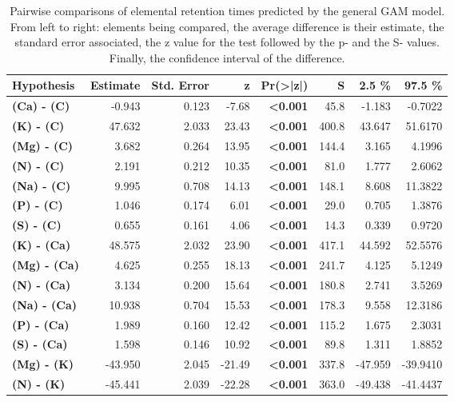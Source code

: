 \begin{table}[H]
\centering
\caption{\label{tab:table_pairs_i_rt}Pairwise comparisons of elemental retention times predicted by the general GAM model. From left to right: elements being compared, the average difference is their estimate, the standard error associated, the z value for the test followed by the p- and the S- values. Finally, the confidence interval of the difference.}
\centering
\begin{tabular}[t]{>{}lrrr>{}rrrr}
\toprule
\textbf{Hypothesis} & \textbf{Estimate} & \textbf{Std. Error} & \textbf{z} & \textbf{Pr(>|z|)} & \textbf{S} & \textbf{2.5 \%} & \textbf{97.5 \%}\\
\midrule
\textbf{(Ca) - (C)} & -0.943 & 0.123 & -7.68 & \textbf{<0.001} & 45.8 & -1.183 & -0.7022\\
\textbf{(K) - (C)} & 47.632 & 2.033 & 23.43 & \textbf{<0.001} & 400.8 & 43.647 & 51.6170\\
\textbf{(Mg) - (C)} & 3.682 & 0.264 & 13.95 & \textbf{<0.001} & 144.4 & 3.165 & 4.1996\\
\textbf{(N) - (C)} & 2.191 & 0.212 & 10.35 & \textbf{<0.001} & 81.0 & 1.777 & 2.6062\\
\textbf{(Na) - (C)} & 9.995 & 0.708 & 14.13 & \textbf{<0.001} & 148.1 & 8.608 & 11.3822\\
\textbf{(P) - (C)} & 1.046 & 0.174 & 6.01 & \textbf{<0.001} & 29.0 & 0.705 & 1.3876\\
\textbf{(S) - (C)} & 0.655 & 0.161 & 4.06 & \textbf{<0.001} & 14.3 & 0.339 & 0.9720\\
\textbf{(K) - (Ca)} & 48.575 & 2.032 & 23.90 & \textbf{<0.001} & 417.1 & 44.592 & 52.5576\\
\textbf{(Mg) - (Ca)} & 4.625 & 0.255 & 18.13 & \textbf{<0.001} & 241.7 & 4.125 & 5.1249\\
\textbf{(N) - (Ca)} & 3.134 & 0.200 & 15.64 & \textbf{<0.001} & 180.8 & 2.741 & 3.5269\\
\textbf{(Na) - (Ca)} & 10.938 & 0.704 & 15.53 & \textbf{<0.001} & 178.3 & 9.558 & 12.3186\\
\textbf{(P) - (Ca)} & 1.989 & 0.160 & 12.42 & \textbf{<0.001} & 115.2 & 1.675 & 2.3031\\
\textbf{(S) - (Ca)} & 1.598 & 0.146 & 10.92 & \textbf{<0.001} & 89.8 & 1.311 & 1.8852\\
\textbf{(Mg) - (K)} & -43.950 & 2.045 & -21.49 & \textbf{<0.001} & 337.8 & -47.959 & -39.9410\\
\textbf{(N) - (K)} & -45.441 & 2.039 & -22.28 & \textbf{<0.001} & 363.0 & -49.438 & -41.4437\\

\end{tabular}
\end{table}
